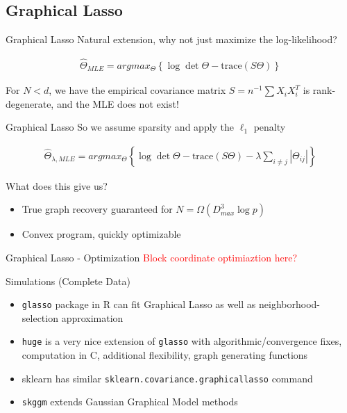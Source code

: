 \documentclass{beamer}
\begin{document}
\subsection{Graphical Lasso}

\begin{frame}{Graphical Lasso}
Natural extension, why not just maximize the log-likelihood?

\begin{gather*}
    \hat{\Theta}_{MLE}
    =
    argmax_\Theta
    \left\{
        \log \det \Theta - \text{trace}(S\Theta)
    \right\}
\end{gather*}

For $N<d$, we have the empirical covariance matrix $S = n^{-1}\sum X_i X_i^T$ is rank-degenerate, and the MLE does not exist!

\end{frame}



\begin{frame}{Graphical Lasso}
So we assume sparsity and apply the $\ell_1$ penalty

\begin{gather*}
    \hat{\Theta}_{\lambda, MLE}
    =
    argmax_\Theta
    \left\{
        \log \det \Theta - \text{trace}(S\Theta)
        -
        \lambda \sum_{i\neq j} |\Theta_{ij}|
    \right\}
\end{gather*}

What does this give us? 
\begin{itemize}
    \item True graph recovery guaranteed for $N=\Omega(D_{max}^3\log p)$
    \item Convex program, quickly optimizable 
\end{itemize}
\end{frame}

\begin{frame}{Graphical Lasso - Optimization}
    \textcolor{red}{Block coordinate optimiaztion here?}
\end{frame}

\begin{frame}{Simulations (Complete Data)}
    \begin{itemize}
        \item \texttt{glasso} package in R can fit Graphical Lasso as well as neighborhood-selection approximation 
        \item \texttt{huge} is a very nice extension of \texttt{glasso} with algorithmic/convergence fixes, computation in C, additional flexibility, graph generating functions 
        \item sklearn has similar \texttt{sklearn.covariance.graphicallasso} command 
        \item \texttt{skggm} extends Gaussian Graphical Model methods  %
    \end{itemize}
\end{frame}
\end{document}
